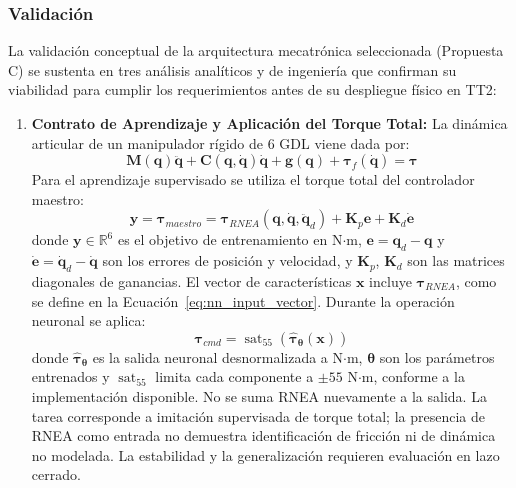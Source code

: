 \documentclass[12pt]{article}
\begin{document}
\subsubsection{Validación}
\label{sssec:validacion_conceptual}

La validación conceptual de la arquitectura mecatrónica seleccionada (Propuesta C) se sustenta en tres análisis analíticos y de ingeniería que confirman su viabilidad para cumplir los requerimientos antes de su despliegue físico en TT2:

\begin{enumerate}
    \item \textbf{Contrato de Aprendizaje y Aplicación del Torque Total:}
    La dinámica articular de un manipulador rígido de 6 GDL viene dada por:
    \begin{equation}
        \bm{M}(\bm{q})\ddot{\bm{q}} + \bm{C}(\bm{q},\dot{\bm{q}})\dot{\bm{q}} + \bm{g}(\bm{q}) + \bm{\tau}_f(\dot{\bm{q}}) = \bm{\tau}
    \end{equation}
    Para el aprendizaje supervisado se utiliza el torque total del controlador maestro:
    \begin{equation}
        \bm{y} = \bm{\tau}_{maestro} = \bm{\tau}_{RNEA}(\bm{q},\dot{\bm{q}},\ddot{\bm{q}}_d) + \bm{K}_p\bm{e} + \bm{K}_d\dot{\bm{e}}
        \label{eq:torque_maestro}
    \end{equation}
    donde $\bm{y}\in\mathbb{R}^6$ es el objetivo de entrenamiento en N$\cdot$m, $\bm{e}=\bm{q}_d-\bm{q}$ y $\dot{\bm{e}}=\dot{\bm{q}}_d-\dot{\bm{q}}$ son los errores de posición y velocidad, y $\bm{K}_p$, $\bm{K}_d$ son las matrices diagonales de ganancias. El vector de características $\bm{x}$ incluye $\bm{\tau}_{RNEA}$, como se define en la Ecuación~\eqref{eq:nn_input_vector}. Durante la operación neuronal se aplica:
    \begin{equation}
        \bm{\tau}_{cmd} = \operatorname{sat}_{55}\!\left(\hat{\bm{\tau}}_{\bm{\theta}}(\bm{x})\right)
        \label{eq:torque_total_neuronal}
    \end{equation}
    donde $\hat{\bm{\tau}}_{\bm{\theta}}$ es la salida neuronal desnormalizada a N$\cdot$m, $\bm{\theta}$ son los parámetros entrenados y $\operatorname{sat}_{55}$ limita cada componente a $\pm55$ N$\cdot$m, conforme a la implementación disponible. No se suma RNEA nuevamente a la salida. La tarea corresponde a imitación supervisada de torque total; la presencia de RNEA como entrada no demuestra identificación de fricción ni de dinámica no modelada. La estabilidad y la generalización requieren evaluación en lazo cerrado.


\end{enumerate}
\end{document}
